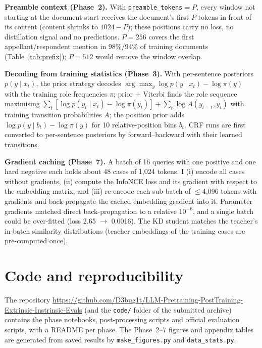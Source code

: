 \documentclass[11pt, oneside]{article}
\begin{document}
\textbf{Preamble context (Phase~2).} With \texttt{preamble\_tokens}$=P$, every window not starting at the document start
receives the document's first $P$ tokens in front of its content (content shrinks to $1024-P$); these positions carry no
loss, no distillation signal and no predictions. $P=256$ covers the first appellant/respondent mention in 98\%/94\% of
training documents (Table~\ref{tab:prefix}); $P=512$ would remove the window overlap.

\textbf{Decoding from training statistics (Phase~3).} With per-sentence posteriors $p(y\mid x_t)$, the prior strategy
decodes $\arg\max_y \log p(y\mid x_t)-\log\pi(y)$ with the training role frequencies $\pi$; prior + Viterbi finds the
role sequence maximising $\sum_t[\log p(y_t\mid x_t)-\log\pi(y_t)]+\sum_t\log A(y_{t-1},y_t)$ with training transition
probabilities $A$; the position prior adds $\log p(y\mid b_t)-\log\pi(y)$ for 10 relative-position bins $b_t$. CRF runs
are first converted to per-sentence posteriors by forward--backward with their learned transitions.

\textbf{Gradient caching (Phase~7).} A batch of 16 queries with one positive and one hard negative each holds about 48
cases of 1{,}024 tokens. I (i) encode all cases without gradients, (ii) compute the InfoNCE loss and its gradient with
respect to the embedding matrix, and (iii) re-encode each sub-batch of $\le$4{,}096 tokens with gradients and
back-propagate the cached embedding gradient into it. Parameter gradients matched direct back-propagation to a relative
$10^{-6}$, and a single batch could be over-fitted (loss 2.65 $\to$ 0.0016). The KD student matches the teacher's
in-batch similarity distributions (teacher embeddings of the training cases are pre-computed once).

\section{Code and reproducibility}\label{app:code}
The repository \url{https://github.com/D3bug1t/LLM-Pretraining-PostTraining-Extrinsic-Instrinsic-Evals} (and the
\texttt{code/} folder of the submitted archive) contains the phase notebooks, post-processing scripts and official
evaluation scripts, with a README per phase. The Phase~2--7 figures and appendix tables are generated from saved results by \texttt{make\_figures.py}
and \texttt{data\_stats.py}.
\end{document}
